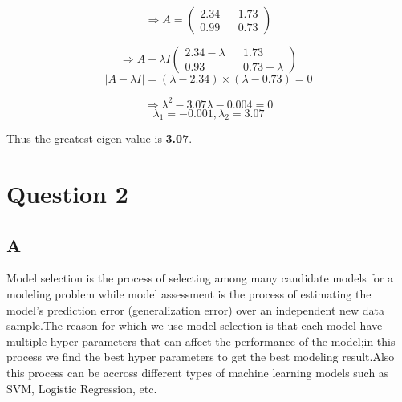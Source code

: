 \documentclass{article}
\begin{document}
\begin{equation*}
    \Rightarrow A = \begin{pmatrix}
        2.34 && 1.73 \\ 0.99 && 0.73
    \end{pmatrix}
\end{equation*}

\begin{equation*}
    \Rightarrow A - \lambda I \begin{pmatrix}
        2.34 - \lambda && 1.73 \\ 0.93 && 0.73 - \lambda
    \end{pmatrix}
\end{equation*}
\begin{equation*}
    |A - \lambda I| = (\lambda - 2.34)\times(\lambda - 0.73) = 0
\end{equation*}

\begin{equation*}
    \Rightarrow \lambda^2 - 3.07\lambda - 0.004 = 0
\end{equation*}
\begin{equation*}
    \lambda_1 = -0.001, \lambda_2 = 3.07
\end{equation*}

Thus the greatest eigen value is \textbf{3.07}.

\section*{Question 2}
\subsection*{A}
Model selection is the process of selecting among many candidate models for a modeling problem while model assessment is the process of estimating the model's
 prediction error (generalization error) over an independent new data sample.The reason for which we use model selection is that
 each model have multiple hyper parameters that can affect the performance of the model;in this process we find the best hyper parameters 
 to get the best modeling result.Also this process can be accross different types of machine learning models such as SVM, Logistic Regression, etc.
\end{document}
